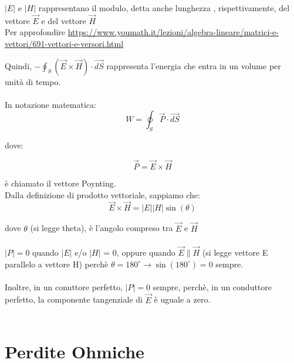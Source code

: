 \begin{tcolorbox}
    $\left| E \right|$ e $\left| H \right|$ rappresentano il modulo, detta anche lunghezza , rispettivamente, del vettore $\vec{E}$ e del vettore $\vec{H}$ \\
    Per approfondire \url{https://www.youmath.it/lezioni/algebra-lineare/matrici-e-vettori/691-vettori-e-versori.html}
\end{tcolorbox} 

Quindi, $- \oint_S (\vec{E} \times \vec{H}) \cdot \vec{dS} $ rappresenta l'energia che entra in un volume per unità di tempo. \\ \\
In notazione matematica: 
{   
    \Large
    \begin{equation}
    W = \oint_S \vec{P} \cdot \vec{dS}      
    \end{equation}
}

dove: 

{   
    \Large
    \begin{equation}
    \vec{P} = \vec{E} \times \vec{H}        
    \end{equation}
}

è chiamato il vettore Poynting.  \\

Dalla definizione di prodotto vettoriale, sappiamo che: 
{
    \Large
    \begin{equation}
  \vec{E} \times \vec{H} = \left|E\right| \left|H\right| \sin(\theta)      
    \end{equation}
}

dove $\theta$ (si legge theta), è l'angolo compreso tra $\vec{E}$ e $\vec{H}$ \\ \\ 

$\left|P\right| = 0$ quando $\left|E\right|$ e/o $\left|H\right|$ = 0, oppure quando 
$\vec{E} \parallel \vec{H}$ (si legge vettore E parallelo a vettore H) perchè $\theta = 180 ^{\circ} \rightarrow \sin(180^{\circ}) = 0$ sempre. \\ \\ 

Inoltre, in un conuttore perfetto, $\left|P\right| = 0$ sempre, perchè, in un conduttore perfetto, la componente tangenziale di $\vec{E}$ è uguale a zero. \\ \\ 

\newpage 


\section{Perdite Ohmiche} 

